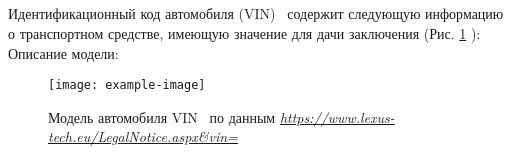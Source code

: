 
\subparagraph*{} Идентификационный код автомобиля (VIN)  \vin \, содержит следующую информацию о транспортном средстве, имеющую значение для 	дачи заключения (Рис. \ref{fig:vin} ):\\[3mm]
%	
%	


Описание модели:
\begin{figure}[H]
	\centering
	\texttt{[image: example-image]}
	\caption[]{{\footnotesize Модель  автомобиля VIN \vin\, по данным\textit{ \url{https://www.lexus-tech.eu/LegalNotice.aspx\&vin=}}} }
	\label{fig:vin}
\end{figure}


